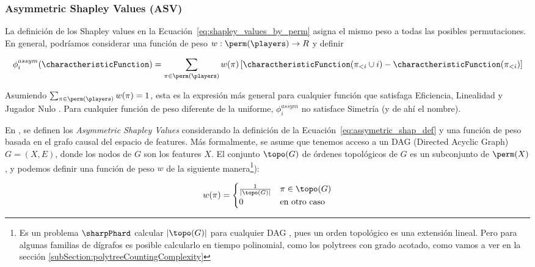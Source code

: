 
\subsubsection{Asymmetric Shapley Values (ASV)}

La definición de los Shapley values en la Ecuación~\ref{eq:shapley_values_by_perm} asigna el mismo peso a todas las posibles permutaciones. En general, podríamos considerar una función de peso \(w:\perm(\players) \to R\) y definir

\begin{align}\label{eq:assymetric_shap_def}
   \phi_{i}^{assym}(\charactheristicFunction) = \sum_{\pi \in \perm(\players)} w(\pi) \left[ \charactheristicFunction(\pi_{<i} \cup {i}) - \charactheristicFunction(\pi_{<i}) \right] 
\end{align}

Asumiendo \(\sum_{\pi \in \perm(\players)} w(\pi) = 1\), esta es la expresión más general para cualquier función que satisfaga Eficiencia, Linealidad y Jugador Nulo \cite{frye2019asymmetric}. Para cualquier función de peso diferente de la uniforme, \(\phi_i^{assym}\) no satisface Simetría (y de ahí el nombre).

En \cite{frye2019asymmetric}, se definen los \textit{Asymmetric Shapley Values} considerando la definición de la Ecuación~\ref{eq:assymetric_shap_def} y una función de peso basada en el grafo causal del espacio de features. Más formalmente, se asume que tenemos acceso a un DAG (Directed Acyclic Graph) \(G = (X, E)\), donde los nodos de \(G\) son los features \(X\). El conjunto \(\topo(G)\) de órdenes topológicos de \(G\) es un subconjunto de \(\perm(X)\), y podemos definir una función de peso \(w\) de la siguiente manera\footnote{Es un problema $\sharpPhard$ calcular $|\topo(G)|$  para cualquier DAG \cite{countingLinearExtensions}, pues un orden topológico es una extensión lineal. Pero para algunas familias de dígrafos es posible calcularlo en tiempo polinomial, como los polytrees con grado acotado, como vamos a ver en la sección \ref{subSection:polytreeCountingComplexity} }):

\[
w(\pi) = \begin{cases}
\frac{1}{|\topo(G)|}  & \pi \in \topo(G) \\
0 & \text{en otro caso}
\end{cases}    
\]


